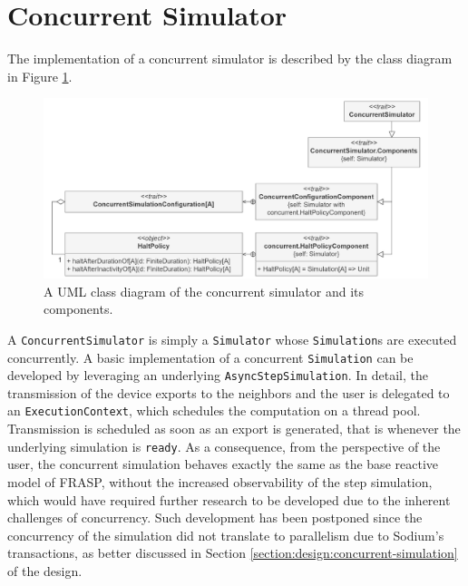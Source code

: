 
\section{Concurrent Simulator}
\label{section:implementation:concurrent-simulator}

The implementation of a concurrent simulator is described by the class diagram
in Figure \ref{figure:concurrent-simulator-class-diagram}.

\begin{figure}[!ht]
  \centering
  \includegraphics[width=1\textwidth]{resources/figures/diagrams/short/concurrent-simulator-class-diagram.pdf}
  \caption[A UML class diagram of the concurrent simulator]{
    A UML class diagram of the concurrent simulator and its components.
  }
  \label{figure:concurrent-simulator-class-diagram}
\end{figure}

A \texttt{ConcurrentSimulator} is simply a \texttt{Simulator} whose
\texttt{Simulation}s are executed concurrently. A basic implementation of a
concurrent \texttt{Simulation} can be developed by leveraging an underlying
\texttt{AsyncStepSimulation}. In detail, the transmission of the device exports
to the neighbors and the user is delegated to an \texttt{ExecutionContext},
which schedules the computation on a thread pool. Transmission is scheduled as
soon as an export is generated, that is whenever the underlying simulation is
\texttt{ready}. As a consequence, from the perspective of the user, the
concurrent simulation behaves exactly the same as the base reactive model of
FRASP, without the increased observability of the step simulation, which would
have required further research to be developed due to the inherent challenges
of concurrency. Such development has been postponed since the concurrency of
the simulation did not translate to parallelism due to Sodium's transactions,
as better discussed in Section \ref{section:design:concurrent-simulation} of
the design.

